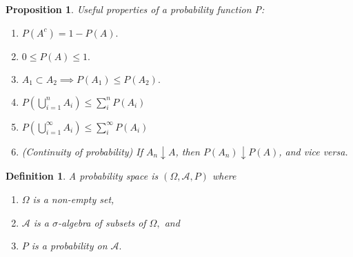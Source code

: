 \documentclass[12pt]{report} \addtolength{\textheight}{2in}
\newtheorem{defn}{Definition}
\newtheorem{prop}{Proposition}
\newcommand{\bigA}{\mathcal{A}}
\newcommand{\finU}{ \bigcup_{i=1}^{n}}
\newcommand{\infU}{ \bigcup_{i=1}^{\infty}}
\begin{document}
\begin{prop}
Useful properties of a probability function P: 
\begin{enumerate}
\item[P1:] $P(A^c)=1-P(A).$
\item[P2:] $0 \leq P(A)\leq 1.$
\item[P3:] $A_1 \subset A_2 \implies P(A_1) \leq P(A_2).$
\item[P4:] $P(\finU A_i) \leq \sum_{i}^{n} P(A_i)$
\item[P5:] $P(\infU A_i) \leq \sum_{i}^{\infty} P(A_i)$
\item[P6:] (Continuity of probability) If $A_n \downarrow A$, then $P(A_n) \downarrow P(A)$, and vice versa.
\end{enumerate}
\end{prop}
\begin{defn}
A probability space is $(\Omega, \bigA, P)$ where
\begin{enumerate}
\item $\Omega$ is a non-empty set,
\item $\bigA$ is a $\sigma$-algebra of subsets of $\Omega,$ and
\item $P$ is a probability on $\bigA.$
\end{enumerate}
\end{defn}
\end{document}
